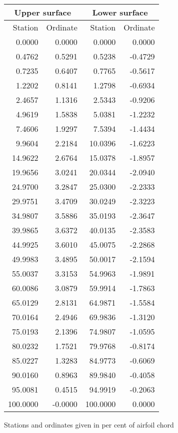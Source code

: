 \documentclass[11pt]{book}
\begin{document}
 \hspace{4mm}
 \begin{tabular}{|r|r|r|r|} \hline 
 \multicolumn{2}{|c|}{Upper surface} & \multicolumn{2}{|c|}{Lower surface} \\
 \hline
 Station & Ordinate & Station & Ordinate \\
 \hline
0.0000 & 0.0000 & 0.0000 & 0.0000 \\
0.4762 & 0.5291 & 0.5238 & -0.4729 \\
0.7235 & 0.6407 & 0.7765 & -0.5617 \\
1.2202 & 0.8141 & 1.2798 & -0.6934 \\
2.4657 & 1.1316 & 2.5343 & -0.9206 \\
4.9619 & 1.5838 & 5.0381 & -1.2232 \\
7.4606 & 1.9297 & 7.5394 & -1.4434 \\
9.9604 & 2.2184 & 10.0396 & -1.6223 \\
14.9622 & 2.6764 & 15.0378 & -1.8957 \\
19.9656 & 3.0241 & 20.0344 & -2.0940 \\
24.9700 & 3.2847 & 25.0300 & -2.2333 \\
29.9751 & 3.4709 & 30.0249 & -2.3223 \\
34.9807 & 3.5886 & 35.0193 & -2.3647 \\
39.9865 & 3.6372 & 40.0135 & -2.3583 \\
44.9925 & 3.6010 & 45.0075 & -2.2868 \\
49.9983 & 3.4895 & 50.0017 & -2.1594 \\
55.0037 & 3.3153 & 54.9963 & -1.9891 \\
60.0086 & 3.0879 & 59.9914 & -1.7863 \\
65.0129 & 2.8131 & 64.9871 & -1.5584 \\
70.0164 & 2.4946 & 69.9836 & -1.3120 \\
75.0193 & 2.1396 & 74.9807 & -1.0595 \\
80.0232 & 1.7521 & 79.9768 & -0.8174 \\
85.0227 & 1.3283 & 84.9773 & -0.6069 \\
90.0160 & 0.8963 & 89.9840 & -0.4058 \\
95.0081 & 0.4515 & 94.9919 & -0.2063 \\
100.0000 & -0.0000 & 100.0000 & 0.0000 \\
 \hline 
 \end{tabular}
 \vspace{8mm}

Stations and ordinates given in per cent of airfoil chord
\end{document}
